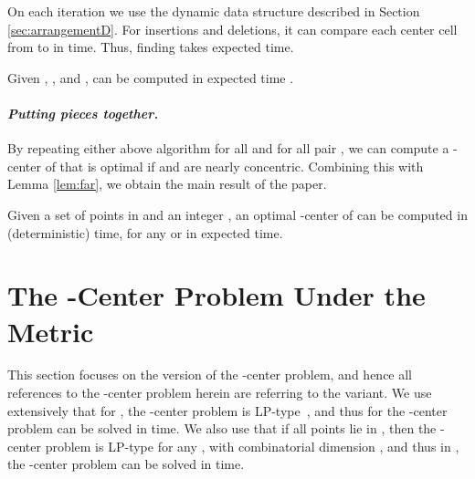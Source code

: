 \documentclass[11pt]{myclass}
\begin{document}
On each iteration we use the dynamic data structure described in Section \ref{sec:arrangementD}.  For  insertions and deletions, it can compare each center cell from  to  in  time.  
Thus, finding  takes expected  time.  

\begin{lemma}
Given , , and , 
 can be computed in expected time .
\label{lem:nearR}
\end{lemma}





\paragraph{\textbf{\emph{Putting pieces together.}}}
By repeating either above algorithm for all  and for all pair , we can compute a -center of  that is optimal if  and  are nearly concentric.  Combining this with Lemma \ref{lem:far}, we obtain the main result of the paper.

\begin{theorem}
Given a set  of  points in  and an integer , an optimal -center of  can be computed in  (deterministic) time, for any  
or in  expected time.
\end{theorem}













































\section{The -Center Problem Under the  Metric}

This section focuses on the  version of the -center problem, and hence all references to the -center problem herein are referring to the  variant.  We use extensively that for , the -center problem is LP-type~\cite{SW96}, and thus for  the -center problem can be solved in  time.  We also use that if all points lie in , then the -center problem is LP-type for any , with combinatorial dimension , and thus in , the -center problem can be solved in  time.  
\end{document}
